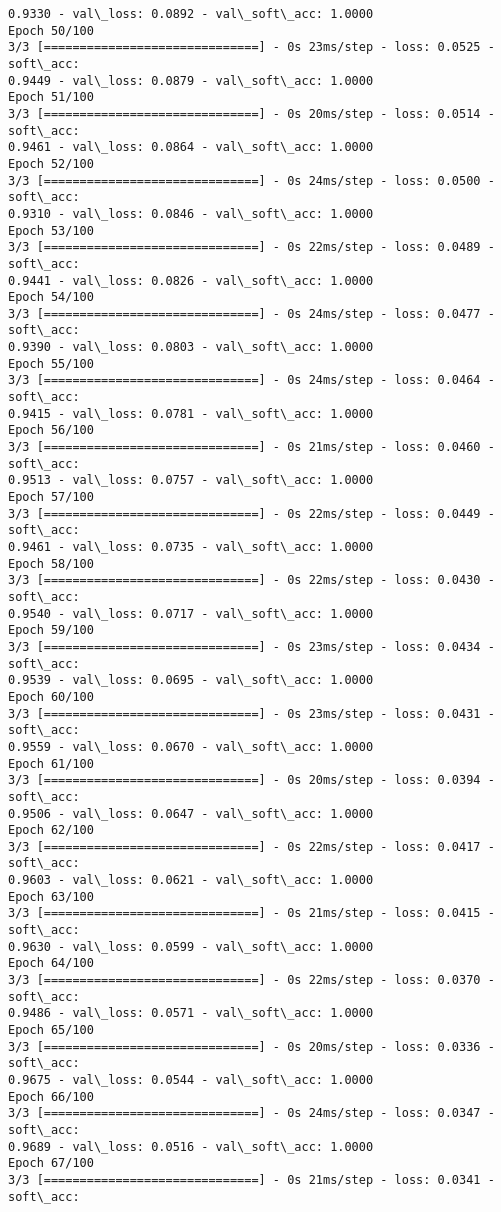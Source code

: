 \documentclass[11pt]{article}
\begin{document}
\begin{Verbatim}[commandchars=\\\{\}]
0.9330 - val\_loss: 0.0892 - val\_soft\_acc: 1.0000
Epoch 50/100
3/3 [==============================] - 0s 23ms/step - loss: 0.0525 - soft\_acc:
0.9449 - val\_loss: 0.0879 - val\_soft\_acc: 1.0000
Epoch 51/100
3/3 [==============================] - 0s 20ms/step - loss: 0.0514 - soft\_acc:
0.9461 - val\_loss: 0.0864 - val\_soft\_acc: 1.0000
Epoch 52/100
3/3 [==============================] - 0s 24ms/step - loss: 0.0500 - soft\_acc:
0.9310 - val\_loss: 0.0846 - val\_soft\_acc: 1.0000
Epoch 53/100
3/3 [==============================] - 0s 22ms/step - loss: 0.0489 - soft\_acc:
0.9441 - val\_loss: 0.0826 - val\_soft\_acc: 1.0000
Epoch 54/100
3/3 [==============================] - 0s 24ms/step - loss: 0.0477 - soft\_acc:
0.9390 - val\_loss: 0.0803 - val\_soft\_acc: 1.0000
Epoch 55/100
3/3 [==============================] - 0s 24ms/step - loss: 0.0464 - soft\_acc:
0.9415 - val\_loss: 0.0781 - val\_soft\_acc: 1.0000
Epoch 56/100
3/3 [==============================] - 0s 21ms/step - loss: 0.0460 - soft\_acc:
0.9513 - val\_loss: 0.0757 - val\_soft\_acc: 1.0000
Epoch 57/100
3/3 [==============================] - 0s 22ms/step - loss: 0.0449 - soft\_acc:
0.9461 - val\_loss: 0.0735 - val\_soft\_acc: 1.0000
Epoch 58/100
3/3 [==============================] - 0s 22ms/step - loss: 0.0430 - soft\_acc:
0.9540 - val\_loss: 0.0717 - val\_soft\_acc: 1.0000
Epoch 59/100
3/3 [==============================] - 0s 23ms/step - loss: 0.0434 - soft\_acc:
0.9539 - val\_loss: 0.0695 - val\_soft\_acc: 1.0000
Epoch 60/100
3/3 [==============================] - 0s 23ms/step - loss: 0.0431 - soft\_acc:
0.9559 - val\_loss: 0.0670 - val\_soft\_acc: 1.0000
Epoch 61/100
3/3 [==============================] - 0s 20ms/step - loss: 0.0394 - soft\_acc:
0.9506 - val\_loss: 0.0647 - val\_soft\_acc: 1.0000
Epoch 62/100
3/3 [==============================] - 0s 22ms/step - loss: 0.0417 - soft\_acc:
0.9603 - val\_loss: 0.0621 - val\_soft\_acc: 1.0000
Epoch 63/100
3/3 [==============================] - 0s 21ms/step - loss: 0.0415 - soft\_acc:
0.9630 - val\_loss: 0.0599 - val\_soft\_acc: 1.0000
Epoch 64/100
3/3 [==============================] - 0s 22ms/step - loss: 0.0370 - soft\_acc:
0.9486 - val\_loss: 0.0571 - val\_soft\_acc: 1.0000
Epoch 65/100
3/3 [==============================] - 0s 20ms/step - loss: 0.0336 - soft\_acc:
0.9675 - val\_loss: 0.0544 - val\_soft\_acc: 1.0000
Epoch 66/100
3/3 [==============================] - 0s 24ms/step - loss: 0.0347 - soft\_acc:
0.9689 - val\_loss: 0.0516 - val\_soft\_acc: 1.0000
Epoch 67/100
3/3 [==============================] - 0s 21ms/step - loss: 0.0341 - soft\_acc:

\end{Verbatim}
\end{document}
